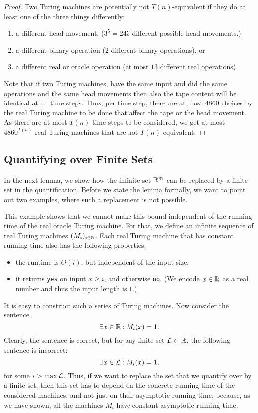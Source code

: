 \documentclass{article}
\begin{document}
\begin{proof}
    Two Turing machines are potentially not $T(n)$-equivalent if they do at least one of the three things differently:
    \begin{enumerate}
        \item a different head movement, ($3^5 = 243$ different possible head movements.)
        \item a different binary operation ($2$ different binary operations), or
        \item a different real or oracle operation (at most $13$ different real operations).
    \end{enumerate}
    Note that if two Turing machines, have the same input and did the same operations and the same head movements then also the tape content will be identical at all time steps.
    Thus, per time step, there are at most $4860$ choices by the real Turing machine to be done that affect the tape or the head movement.
    As there are at most $T(n)$ time steps to be considered,
    we get at most 
    \(4860^{T(n)}\) real Turing machines that are not $T(n)$-equivalent.
\end{proof}




\subsection{Quantifying over Finite Sets}
\label{sub:finitequantification}
In the next lemma, we show how the infinite set $\mathbb{R}^m$ can be replaced by a finite set in the quantification.
Before we state the lemma formally, we want to point out two examples, where such a replacement is not possible.
\begin{example}
    This example shows that we cannot make this bound independent of the running time of the real oracle Turing machine.
    For that, we define an infinite sequence of real Turing machines $(M_i)_{i\in \mathbb{N}}$.
    Each real Turing machine that has constant running time also has the following properties:
    \begin{itemize}
        \item the runtime is $\Theta(i)$, but independent of the input size,
        \item it returns \texttt{yes} on input $x\geq i$, and otherwise \texttt{no}.
        (We encode $x \in \mathbb{R}$ as a real number and thus the input length is $1$.)
    \end{itemize}
    It is easy to construct such a series of Turing machines.
    Now consider the sentence 
    \[\exists x \in \mathbb{R} : M_i(x) = 1.\]
    Clearly, the sentence is correct, but for any finite set $\mathcal{L}\subset \mathbb{R}$, the following sentence is incorrect:
    \[\exists x \in \mathcal{L} : M_i(x) = 1,\]
    for some $i > \max \mathcal{L}$.
    Thus, if we want to replace the set that we quantify over by a finite set, then this set has to depend 
    on the concrete running time of the considered machines, and not just on their asymptotic running time,
    because, as we have shown, all the machines $M_i$ have constant asymptotic running time.
\end{example}
\end{document}
